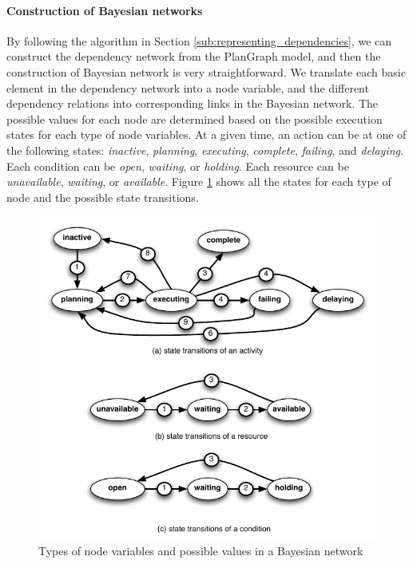 \paragraph*{Construction of Bayesian networks} %
\label{par:construction_of_bayesian_networks}
By following the algorithm in Section \ref{sub:representing_dependencies}, we can construct the dependency network from the PlanGraph model, and then the construction of Bayesian network is very straightforward. We translate each basic element in the dependency network into a node variable, and the different dependency relations into corresponding links in the Bayesian network. The possible values for each node are determined based on the possible execution states for each type of node variables. At a given time, an action can be at one of the following states: \emph{inactive}, \emph{planning}, \emph{executing}, \emph{complete}, \emph{failing}, and \emph{delaying}. Each condition can be \emph{open}, \emph{waiting}, or \emph{holding}. Each resource can be \emph{unavailable}, \emph{waiting}, or \emph{available}. Figure \ref{fig:state_transitions} shows all the states for each type of node and the possible state transitions.
\begin{figure}[htbp] %
	\centering
	\includegraphics{state_transitions.pdf} 
	\caption{Types of node variables and possible values in a Bayesian network}
	\label{fig:state_transitions}
\end{figure}
